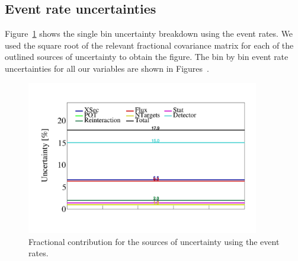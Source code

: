 \documentclass{article}
\begin{document}
\clearpage 

\subsection{Event rate uncertainties}

Figure~\ref{fig:single-bin-uncertainties-event-rates} shows the single bin uncertainty breakdown 
using the event rates. We used the square root of the relevant fractional covariance matrix for 
each of the outlined sources of uncertainty to obtain the figure.
The bin by bin event rate uncertainties for all our variables are shown in 
Figures~.

\begin{figure}[H]
    \centering 
    \includegraphics[width=4in]{../Figs/CAFAna/BinUncertainties/EventCount.png}
    \caption{Fractional contribution for the sources of uncertainty using the event rates.}
    \label{fig:single-bin-uncertainties-event-rates}
\end{figure}
\end{document}
